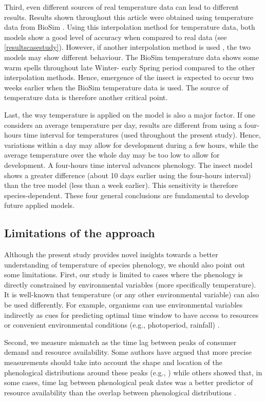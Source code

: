 \documentclass[12 pt]{article}
\begin{document}
Third, even different sources of real temperature data can lead to different results. Results shown throughout this article were obtained using temperature data from BioSim \citep{Regniere2014}. Using this interpolation method for temperature data, both models show a good level of accuracy when compared to real data (see \ref{resultscasestudy}). However, if another interpolation method is used \citep{Thornton2020}, the two models may show different behaviour. The BioSim temperature data shows some warm spells throughout late Winter- early Spring period compared to the other interpolation methods. Hence, emergence of the insect is expected to occur two weeks earlier when the BioSim temperature data is used. The source of temperature data is therefore another critical point.\par  
Last, the way temperature is applied on the model is also a major factor. If one considers an average temperature per day, results are different from using a four-hours time interval for temperatures (used throughout the present study). Hence, variations within a day may allow for development during a few hours, while the average temperature over the whole day may be too low to allow for development. A four-hours time interval advances phenology. The insect model shows a greater difference (about 10 days earlier using the four-hours interval) than the tree model (less than a week earlier). This sensitivity is therefore species-dependent. These four general conclusions are fundamental to develop future applied models.\par

\subsection{Limitations of the approach}
Although the present study provides novel insights towards a better understanding of temperature of species phenology, we should also point out some limitations. First, our study is limited to cases where the phenology is directly constrained by environmental variables (more specifically temperature). It is well-known that temperature (or any other environmental variable) can also be used differently. For example, organisms can use environmental variables indirectly as cues for predicting optimal time window to have access to resources or convenient environmental conditions (e.g., photoperiod, rainfall) \citep{McNamara2011}. \par
Second, we measure mismatch as the time lag between peaks of consumer demand and resource availability. Some authors have argued that more precise measurements should take into account the shape and location of the phenological distributions around these peaks (e.g., \citep{Linden2018}) while others showed that, in some cases, time lag between phenological peak dates was a better predictor of resource availability than the overlap between phenological distributions \citep{Ramakers2020}. \par 
\end{document}
